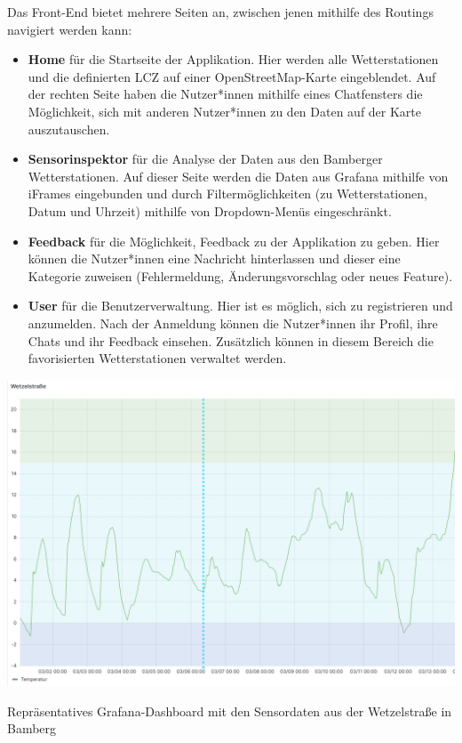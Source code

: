 Das Front-End bietet mehrere Seiten an, zwischen jenen mithilfe des Routings navigiert werden kann:

\begin{itemize}
    \item \textbf{Home} für die Startseite der Applikation. Hier werden alle Wetterstationen und die definierten \ac{LCZ} auf einer OpenStreetMap-Karte eingeblendet. Auf der rechten Seite haben die Nutzer*innen mithilfe eines Chatfensters die Möglichkeit, sich mit anderen Nutzer*innen zu den Daten auf der Karte auszutauschen.
    \item \textbf{Sensorinspektor} für die Analyse der Daten aus den Bamberger Wetterstationen. Auf dieser Seite werden die Daten aus Grafana mithilfe von iFrames eingebunden und durch Filtermöglichkeiten (zu Wetterstationen, Datum und Uhrzeit) mithilfe von Dropdown-Menüs eingeschränkt.
    \item \textbf{Feedback} für die Möglichkeit, Feedback zu der Applikation zu geben. Hier können die Nutzer*innen eine Nachricht hinterlassen und dieser eine Kategorie zuweisen (Fehlermeldung, Änderungsvorschlag oder neues Feature).
    \item \textbf{User} für die Benutzerverwaltung. Hier ist es möglich, sich zu registrieren und anzumelden. Nach der Anmeldung können die Nutzer*innen ihr Profil, ihre Chats und ihr Feedback einsehen. Zusätzlich können in diesem Bereich die favorisierten Wetterstationen verwaltet werden.
\end{itemize}

\begin{marginfigure} %
    \centering
    \includegraphics[width=1\textwidth]{figures/grafana.png}
    \decoRule
    \caption[Grafana-Dashboard]{Repräsentatives Grafana-Dashboard mit den Sensordaten aus der Wetzelstraße in Bamberg}
    \label{fig:grafana}
\end{marginfigure}


